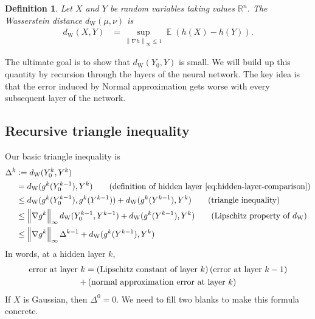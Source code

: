 \documentclass{article}
\newtheorem{definition}{Definition}
\DeclareMathOperator{\expect}{\mathbb{E}}
\begin{document}
\begin{definition}
Let \(X\) and \(Y\) be random variables taking values  \(\mathbb{R}^n\).
The Wasserstein distance \(d_\text{W} (\mu, \nu)\) is 
\begin{align*}
  d_\mathrm{W}(X, Y) &= \sup_{\left\|\nabla h\right\|_{\infty} \leq 1} \expect (h(X) - h(Y)).
\end{align*}
\end{definition}

The ultimate goal is to show that \(d_\text{W} (Y_0,Y)\) is small.
We will build up this quantity by recursion through the layers of the neural network.
The key idea is that the error induced by Normal approximation gets worse with every subsequent layer of the network.

\subsection{Recursive triangle inequality}
Our basic triangle inequality is
\begin{align}
  \Delta^k &:= d_\mathrm{W}(Y_0^k, Y^k) 
  \label{eq:discrepancy}
  \\
  &= d_\mathrm{W}(g^k(Y_0^{k-1}), Y^k)
  \tag{definition of hidden layer \eqref{eq:hidden-layer-comparison}}
  \\
  &\leq d_\mathrm{W}(g^k(Y_0^{k-1}), g^k(Y^{k-1})) + d_\mathrm{W}(g^k(Y^{k-1}), Y^k)
  \tag{triangle inequality}
  \\
  &\leq \left\|\nabla g^k\right\|_\infty d_\mathrm{W}(Y_0^{k-1}, Y^{k-1}) + d_\mathrm{W}(g^k(Y^{k-1}), Y^k)
  \tag{Lipschitz property of \(d_\mathrm{W}\)}
  \\
  &\leq \left\|\nabla g^k\right\|_\infty \Delta^{k-1} + d_\mathrm{W}(g^k(Y^{k-1}), Y^k)
  \label{eq:discrepancy-recursion}
\end{align}
In words, at a hidden layer \(k\),
\begin{multline}
  \text{error at layer \(k\)}
  = \del{\text{Lipschitz constant of layer \(k\)}} \del{\text{error at layer \(k-1\)}} 
  \\
  + \del{\text{normal approximation error at layer \(k\)}}  
\end{multline}
If \(X\) is Gaussian, then \(\Delta^0 = 0\).
We need to fill two blanks to make this formula concrete.
\end{document}

